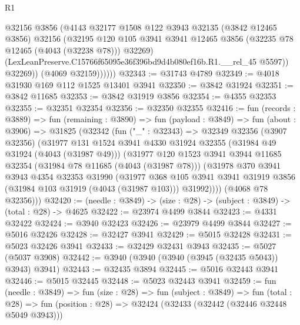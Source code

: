 \begin{lexlean}{R1}
\begin{coremodule}
                  @32156
                  @3856
                  (@4143
                    @32177
                    @1508
                    @122
                    @3943
                    @32135
                    (@3842 @12465 @3856)
                    @32156
                    (@32195
                      @120
                      @105
                      @3941
                      @3941
                      @12465
                      @3856
                      (@32235 @78 @12465 (@4043 (@32238 @78)))
                      @32269)
                    (LexLeanPreserve.C15766f65095e36f396bd9d4b080ef16b.R1.__rel_45 @5597))
                  @32269))
              (@4069 @32159))))))
@32343 := @31743 @4789
@32349 := @4018 @31930 @169 @112 @1525 @13401 @3941
@32350 := @3842 @31924
@32351 := @3842 @11685
@32353 := @3842 @31919 @3856
@32354 := @4355 @32353
@32355 := @32351 @32354
@32356 := @32350 @32355
@32416 := fun (records : @3889) =>
  fun (remaining : @3890) =>
  fun (payload : @3849) =>
  fun (about : @3906) =>
  @31825
    (@32342
      (fun ("_" : @32343) =>
      @32349
        @32356
        (@3907 @32356)
        (@31977
          @131
          @1524
          @3941
          @4330
          @31924
          @32355
          (@31984 @49 @31924 (@4043 (@31987 @49)))
          (@31977
            @120
            @1523
            @3941
            @3944
            @11685
            @32354
            (@31984 @78 @11685 (@4043 (@31987 @78)))
            (@31978
              @370
              @3941
              @3943
              @4354
              @32353
              @31990
              (@31977
                @368
                @105
                @3941
                @3941
                @31919
                @3856
                (@31984 @103 @31919 (@4043 (@31987 @103)))
                @31992))))
        (@4068 @78 @32356)))
@32420 := (needle : @3849) -> (size : @28) -> (subject : @3849) -> (total : @28) -> @4625
@32422 := @23974 @4499 @3844
@32423 := @4331 @32422
@32424 := @3940 @32423
@32426 := @23979 @4499 @3844
@32427 := @5016 @32426
@32428 := @32427 @3941
@32429 := @5015 @32428
@32431 := @5023 @32426 @3941
@32433 := @32429 @32431 @3943
@32435 := @5027 (@5037 @3908)
@32442 := @3940 (@3940 (@3940 (@3945 (@32435 @5043)) @3943) @3941)
@32443 := @32435 @3894
@32445 := @5016 @32443 @3941
@32446 := @5015 @32445
@32448 := @5023 @32443 @3941
@32459 := fun (needle : @3849) =>
  fun (size : @28) =>
  fun (subject : @3849) =>
  fun (total : @28) => fun (position : @28) => @32424 (@32433 (@32442 (@32446 @32448 @5049 @3943)))

\end{coremodule}
\end{lexlean}
